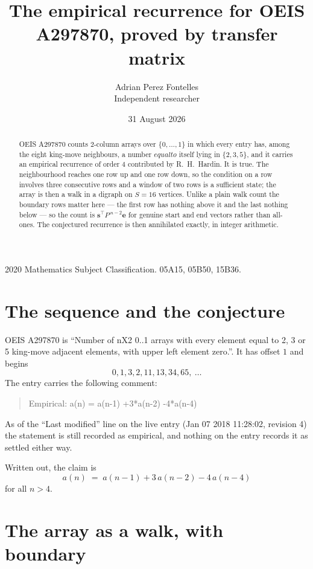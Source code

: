 \documentclass[11pt,a4paper]{article}
\title{The empirical recurrence for OEIS A297870, proved by transfer matrix}
\author{Adrian Perez Fontelles\\ \small Independent researcher}
\date{31 August 2026}
\theoremstyle{plain}
\theoremstyle{definition}
\begin{document}
\maketitle

\begin{abstract}
OEIS A297870 counts $2$-column arrays over $\{0,\dots,1\}$ in which every entry has,
among the eight king-move neighbours, a number $equal to$ itself lying in $\{2,3,5\}$, and it carries an empirical
recurrence of order $4$ contributed by R.~H.~Hardin. It is true. The neighbourhood
reaches one row up and one row down, so the condition on a row involves three consecutive
rows and a window of two rows is a sufficient state; the array is then a walk in a digraph
on $S=16$ vertices. Unlike a plain walk count the boundary rows matter here --- the first
row has nothing above it and the last nothing below --- so the count is
$\mathbf{s}^{\!\top}P^{\,n-2}\mathbf{e}$ for genuine start and end vectors rather than
all-ones. The conjectured recurrence is then annihilated exactly, in integer arithmetic.
\end{abstract}

\noindent\small 2020 Mathematics Subject Classification. 05A15, 05B50, 15B36.\normalsize

\section{The sequence and the conjecture}

OEIS A297870 is ``Number of nX2 0..1 arrays with every element equal to 2, 3 or 5 king-move adjacent elements, with upper left element zero.''. It has offset
$1$ and begins
\[
0, 1, 3, 2, 11, 13, 34, 65,\ \dots
\]
The entry carries the following comment:
\begin{quote}\small
Empirical: a(n) = a(n-1) +3*a(n-2) -4*a(n-4)
\end{quote}
As of the ``Last modified'' line on the live entry (Jan 07 2018 11:28:02, revision
4) the statement is still recorded as empirical, and nothing on the entry
records it as settled either way.

Written out, the claim is
\begin{equation}\label{eq:conj}
a(n)\;=\;a(n-1) + 3\,a(n-2) - 4\,a(n-4)
\end{equation}
for all $n>4$.

\section{The array as a walk, with boundary}
\end{document}
